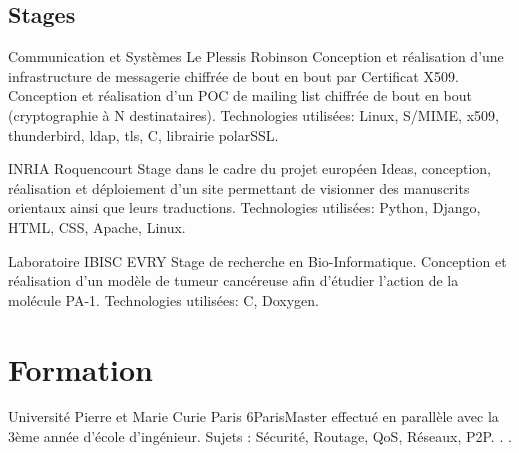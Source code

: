 \documentclass[10pt,a4paper]{moderncv}
\begin{document}
\subsection{Stages}

              {Communication et Systèmes}
              {Le Plessis Robinson}
              {}
              {Conception et réalisation d'une infrastructure de messagerie chiffrée de bout en bout par
               Certificat X509. Conception et réalisation d'un POC de mailing list chiffrée de bout en bout
               (cryptographie à N destinataires).
               \newline Technologies utilisées: Linux, S/MIME, x509, thunderbird, ldap, tls, C, librairie polarSSL.
              }

              {INRIA}
              {Roquencourt}
              {}
              {Stage dans le cadre du projet européen Ideas, 
                 conception, réalisation et déploiement d'un site permettant de visionner 
                 des manuscrits orientaux ainsi que leurs traductions.
                 \newline Technologies utilisées: Python, Django, HTML, CSS, Apache, Linux.
              }

              {Laboratoire IBISC}
              {EVRY}
              {}
              {Stage de recherche en Bio-Informatique. Conception
                et réalisation d'un modèle de tumeur
                cancéreuse afin d'étudier l'action de la molécule PA-1.
                \newline Technologies utilisées: C, Doxygen.
              }


\section{Formation}
{Université Pierre et Marie Curie Paris 6}{Paris}{}{Master effectué en parallèle avec la 3ème année d’école d’ingénieur. Sujets : Sécurité, Routage,
QoS, Réseaux, P2P. . .}
\end{document}
